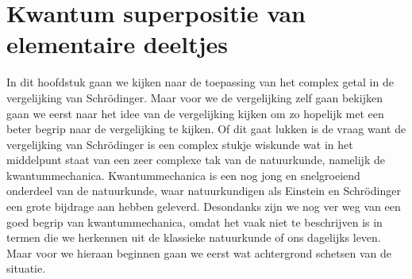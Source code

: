 \documentclass[11pt,fleqn]{book} %
\begin{document}
\chapter{Kwantum superpositie van elementaire deeltjes}
In dit hoofdstuk gaan we kijken naar de toepassing van het complex getal in de vergelijking van Schrödinger. Maar voor we de vergelijking zelf gaan bekijken gaan we eerst naar het idee van de vergelijking kijken om zo hopelijk met een beter begrip naar de vergelijking te kijken. Of dit gaat lukken is de vraag want de vergelijking van Schrödinger is een complex stukje wiskunde wat in het middelpunt staat van een zeer complexe tak van de natuurkunde, namelijk de kwantummechanica. Kwantummechanica is een nog jong en snelgroeiend onderdeel van de natuurkunde, waar natuurkundigen als Einstein en Schrödinger een grote bijdrage aan hebben geleverd. Desondanks zijn we nog ver weg van een goed begrip van kwantummechanica, omdat het vaak niet te beschrijven is in termen die we herkennen uit de klassieke natuurkunde of ons dagelijks leven. Maar voor we hieraan beginnen gaan we eerst wat achtergrond schetsen van de situatie.
\end{document}
